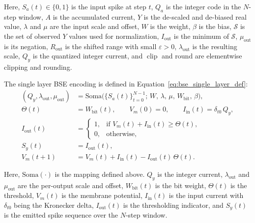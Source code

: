 \documentclass{article}
\theoremstyle{plain}
\theoremstyle{definition}
\theoremstyle{remark}
\begin{document}
Here, $S_a(t)\in\{0,1\}$ is the input spike at step $t$, $Q_a$ is the integer code in the $N$-step window, $A$ is the accumulated current, $Y$ is the de-scaled and de-biased real value, $\lambda$ and $\mu$ are the input scale and offset, $W$ is the weight, $\beta$ is the bias, $\mathcal{S}$ is the set of observed $Y$ values used for normalization, $I_{\mathrm{out}}$ is the minimum of $\mathcal{S}$, $\mu_{\mathrm{out}}$ is its negation, $R_{\mathrm{out}}$ is the shifted range with small $\varepsilon>0$, $\lambda_{\mathrm{out}}$ is the resulting scale, $Q_y$ is the quantized integer current, and $\operatorname{clip}$ and $\mathrm{round}$ are elementwise clipping and rounding.

The single layer BSE encoding is defined in Equation~\ref{eq:bse_single_layer_def}:
\begin{equation}
\label{eq:bse_single_layer_def}
\begin{aligned}
(Q_y,\lambda_{\mathrm{out}},\mu_{\mathrm{out}}) &= \mathrm{Soma}\big(\{S_a(t)\}_{t=0}^{N-1};\, W,\,\lambda,\,\mu,\,W_{\mathrm{bit}},\,\beta\big),\\
\Theta(t) &= W_{\mathrm{bit}}(t),\qquad V_m(0)=0,\qquad I_{\mathrm{in}}(t)=\delta_{t0}\,Q_y,\\
I_{\mathrm{out}}(t) &=
\begin{cases}
1, & \text{if } V_m(t)+I_{\mathrm{in}}(t)\ge \Theta(t),\\
0, & \text{otherwise},
\end{cases}\\
S_y(t) &= I_{\mathrm{out}}(t),\\
V_m(t{+}1) &= V_m(t)+I_{\mathrm{in}}(t)-I_{\mathrm{out}}(t)\,\Theta(t).
\end{aligned}
\end{equation}

Here, $\mathrm{Soma}(\cdot)$ is the mapping defined above. $Q_y$ is the integer current, $\lambda_{\mathrm{out}}$ and $\mu_{\mathrm{out}}$ are the per-output scale and offset, $W_{\mathrm{bit}}(t)$ is the bit weight, $\Theta(t)$ is the threshold, $V_m(t)$ is the membrane potential, $I_{\mathrm{in}}(t)$ is the input current with $\delta_{t0}$ being the Kronecker delta, $I_{\mathrm{out}}(t)$ is the thresholding indicator, and $S_y(t)$ is the emitted spike sequence over the $N$-step window.
\end{document}
